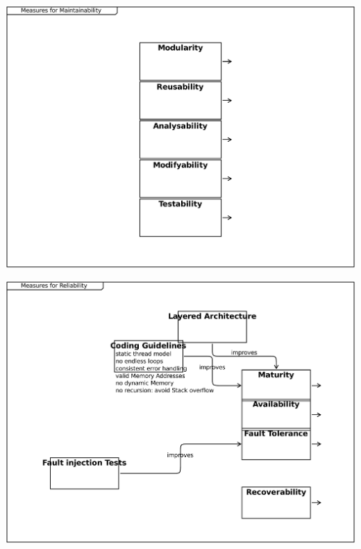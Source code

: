 \documentclass{article}
\begin{document}
\includegraphics[width= 1.0\linewidth]{quality_export/7_Measures_for_Maintainability.pdf}
\begin{alltt}

\end{alltt}

\includegraphics[width= 1.0\linewidth]{quality_export/8_Measures_for_Reliability.pdf}
\begin{alltt}

\end{alltt}
\end{document}
